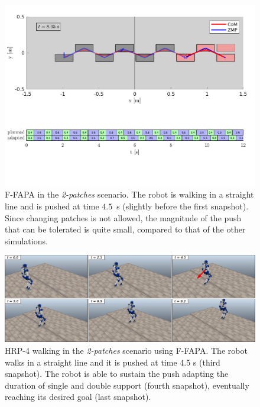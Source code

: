 \begin{figure}
    \includegraphics[trim={0 2.2cm 0 8.6cm},clip,width=\textwidth]{figures/two-patches-fixed-completing-task.pdf}
    \caption{F-FAPA in the {\em 2-patches} scenario. The robot is walking in
        a straight line and is pushed at time $4.5$~s (slightly before the
        first snapshot). Since changing patches is not allowed, the magnitude
        of the push that can be tolerated is quite small, compared to that of
        the other simulations.
    }
    \label{fig:FAPA:matlab_2pacf}
\end{figure}

\begin{figure}
    \centering
    \includegraphics[width=\textwidth]{figures/two-patches-push-fixed-snapshots.jpeg}
    \caption{HRP-4 walking in the \textit{2-patches} scenario using F-FAPA. The robot walks in a straight line and it is pushed at time 4.5 s (third snapshot). The robot is able to sustain the push adapting the duration of single and double support (fourth snapshot), eventually reaching its desired goal (last snapshot).}
    \label{fig:FAPA:sim2:snapshots}
\end{figure}

